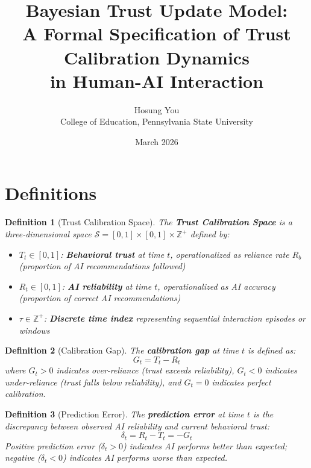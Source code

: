 \documentclass[12pt]{article}
\title{Bayesian Trust Update Model:\\
  A Formal Specification of Trust Calibration Dynamics\\
  in Human-AI Interaction}
\author{Hosung You\\
  College of Education, Pennsylvania State University}
\date{March 2026}
\newtheorem{definition}{Definition}
\begin{document}
\maketitle

\section{Definitions}

\begin{definition}[Trust Calibration Space]
  The \textbf{Trust Calibration Space} is a three-dimensional space
  $\mathcal{S} = [0,1] \times [0,1] \times \mathbb{Z}^+$ defined by:
  \begin{itemize}
    \item $T_t \in [0,1]$: \textbf{Behavioral trust} at time $t$,
      operationalized as reliance rate $R_b$
      (proportion of AI recommendations followed)
    \item $R_t \in [0,1]$: \textbf{AI reliability} at time $t$,
      operationalized as AI accuracy
      (proportion of correct AI recommendations)
    \item $\tau \in \mathbb{Z}^+$: \textbf{Discrete time index}
      representing sequential interaction episodes or windows
  \end{itemize}
\end{definition}

\begin{definition}[Calibration Gap]
  The \textbf{calibration gap} at time $t$ is defined as:
  \begin{equation}
    G_t = T_t - R_t
  \end{equation}
  where $G_t > 0$ indicates \textit{over-reliance}
  (trust exceeds reliability),
  $G_t < 0$ indicates \textit{under-reliance}
  (trust falls below reliability),
  and $G_t = 0$ indicates \textit{perfect calibration}.
\end{definition}

\begin{definition}[Prediction Error]
  The \textbf{prediction error} at time $t$ is the discrepancy between
  observed AI reliability and current behavioral trust:
  \begin{equation}
    \delta_t = R_t - T_t = -G_t
  \end{equation}
  Positive prediction error ($\delta_t > 0$) indicates AI performs
  better than expected; negative ($\delta_t < 0$) indicates AI performs
  worse than expected.
\end{definition}
\end{document}
